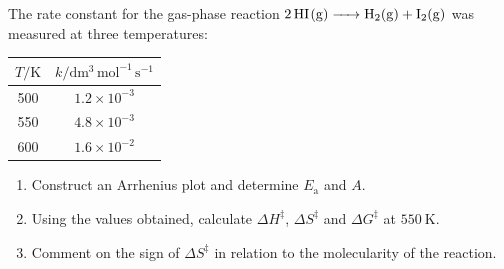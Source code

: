\documentclass[11pt]{article}
\begin{document}
\begin{exercice}
The rate constant for the gas-phase reaction $\ce{2HI(g) -> H2(g) + I2(g)}$ was measured at three temperatures:
\begin{center}
\begin{tabular}{cc}
\hline
$T/\mathrm{K}$ & $k/\mathrm{dm^3\,mol^{-1}\,s^{-1}}$ \\ \hline
500 & $1.2\times10^{-3}$ \\
550 & $4.8\times10^{-3}$ \\
600 & $1.6\times10^{-2}$ \\ \hline
\end{tabular}
\end{center}
\begin{enumerate}
  \item Construct an Arrhenius plot and determine $E_{\mathrm{a}}$ and $A$.
  \item Using the values obtained, calculate $\Delta H^{\ddagger}$, $\Delta S^{\ddagger}$ and $\Delta G^{\ddagger}$ at $550\ \mathrm{K}$.
  \item Comment on the sign of $\Delta S^{\ddagger}$ in relation to the molecularity of the reaction.
\end{enumerate}
\end{exercice}
\end{document}
